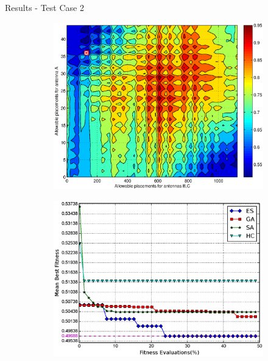 \documentclass{beamer}
\begin{document}
\begin{frame}{Results - Test Case 2}
    \begin{figure}
        \centering
        \begin{subfigure}{.5\columnwidth}
            \includegraphics[width=\columnwidth,height=\columnwidth]{../paper/FIG/tc2_contour}%
        \end{subfigure}\hfill%
        \begin{subfigure}{.5\columnwidth}
            \includegraphics[width=\columnwidth, height=\columnwidth]{../paper/FIG/tc2_mf}%
        \end{subfigure}\hfill\\%
    \end{figure}
\end{frame}
\end{document}
